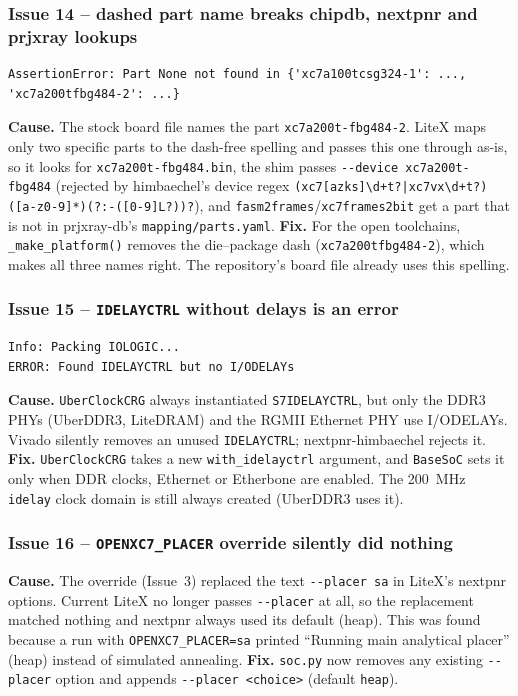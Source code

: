 \documentclass[11pt]{article}
\begin{document}
\subsubsection*{Issue 14 -- dashed part name breaks chipdb, nextpnr and
prjxray lookups}
\begin{lstlisting}[style=termout]
AssertionError: Part None not found in {'xc7a100tcsg324-1': ..., 'xc7a200tfbg484-2': ...}
\end{lstlisting}
\textbf{Cause.} The stock board file names the part
\lstinline{xc7a200t-fbg484-2}. LiteX maps only two specific parts to the
dash-free spelling and passes this one through as-is, so it looks for
\lstinline{xc7a200t-fbg484.bin}, the shim passes
\lstinline{--device xc7a200t-fbg484} (rejected by himbaechel's device
regex \lstinline{(xc7[azks]\d+t?|xc7vx\d+t?)([a-z0-9]*)(?:-([0-9]L?))?}),
and \lstinline{fasm2frames}/\lstinline{xc7frames2bit} get a part that is not
in prjxray-db's \lstinline{mapping/parts.yaml}.
\textbf{Fix.} For the open toolchains, \lstinline{_make_platform()} removes
the die--package dash (\lstinline{xc7a200tfbg484-2}), which makes all three
names right. The repository's board file already uses this spelling.

\subsubsection*{Issue 15 -- \texttt{IDELAYCTRL} without delays is an error}
\begin{lstlisting}[style=termout]
Info: Packing IOLOGIC...
ERROR: Found IDELAYCTRL but no I/ODELAYs
\end{lstlisting}
\textbf{Cause.} \lstinline{UberClockCRG} always instantiated
\lstinline{S7IDELAYCTRL}, but only the DDR3 PHYs (UberDDR3, LiteDRAM) and the
RGMII Ethernet PHY use I/ODELAYs. Vivado silently removes an unused
\lstinline{IDELAYCTRL}; nextpnr-himbaechel rejects it.
\textbf{Fix.} \lstinline{UberClockCRG} takes a new
\lstinline{with_idelayctrl} argument, and \lstinline{BaseSoC} sets it only
when DDR clocks, Ethernet or Etherbone are enabled. The 200~MHz
\lstinline{idelay} clock domain is still always created (UberDDR3 uses it).

\subsubsection*{Issue 16 -- \texttt{OPENXC7\_PLACER} override silently did
nothing}
\textbf{Cause.} The override (Issue~3) replaced the text
\lstinline{--placer sa} in LiteX's nextpnr options. Current LiteX no longer
passes \lstinline{--placer} at all, so the replacement matched nothing and
nextpnr always used its default (heap). This was found because a run with
\lstinline{OPENXC7_PLACER=sa} printed ``Running main analytical placer''
(heap) instead of simulated annealing.
\textbf{Fix.} \lstinline{soc.py} now removes any existing
\lstinline{--placer} option and appends \lstinline{--placer <choice>}
(default \lstinline{heap}).
\end{document}
